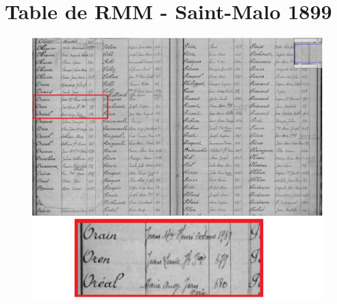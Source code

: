 \documentclass[a4paper]{article}
\begin{document}
\section{Table de RMM - Saint-Malo 1899}
\label{sec:annexe 2}

\begin{figure}[H]
\centering
\includegraphics[width=\textwidth]{Table_Onen.png}
\end{figure}
\end{document}
